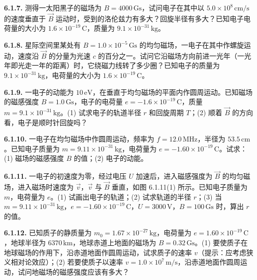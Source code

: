 \vfill
\newpage

\textbf{6.1.7.} 测得一太阳黑子的磁场为 $B = 4000\,\mathrm{Gs}$，试问电子在其中以 $5.0 \times 10^{8}\,\mathrm{cm/s}$ 的速度垂直于 $\vec{B}$ 运动时，受到的洛伦兹力有多大？回旋半径有多大？已知电子电荷量的大小为 $1.6 \times 10^{-19}\,\mathrm{C}$，质量为 $9.1 \times 10^{-31}\,\mathrm{kg}$。

\vfill
\newpage

\textbf{6.1.8.} 星际空间里某处有 $B = 1.0 \times 10^{-5}\,\mathrm{Gs}$ 的均匀磁场，一电子在其中作螺旋运动，速度沿 $\vec{B}$ 的分量为光速 $c$ 的百分之一。试问它沿磁场方向前进一光年（一光年即光走一年的距离）时，它绕磁力线转了多少圈？已知电子的质量为 $9.1 \times 10^{-31}\,\mathrm{kg}$，电荷量的大小为 $1.6 \times 10^{-19}\,\mathrm{C}$。

\vfill
\newpage

\textbf{6.1.9.} 一电子的动能为 $10\,\mathrm{eV}$，在垂直于均匀磁场的平面内作圆周运动。已知磁场的磁感强度 $B = 1.0\,\mathrm{Gs}$，电子的电荷量 $e = -1.6 \times 10^{-19}\,\mathrm{C}$，质量 $m = 9.1 \times 10^{-31}\,\mathrm{kg}$。(1) 试求电子的轨道半径 $r$ 和回旋周期 $T$；(2) 顺着 $\vec{B}$ 的方向看，电子是顺时针回旋吗？

\vfill
\newpage

\textbf{6.1.10.} 一电子在均匀磁场中作圆周运动，频率为 $f = 12.0\,\mathrm{MHz}$，半径为 $53.5\,\mathrm{cm}$。已知电子质量为 $m = 9.11 \times 10^{-31}\,\mathrm{kg}$，电荷量为 $e = -1.60 \times 10^{-19}\,\mathrm{C}$。试求：(1) 磁场的磁感强度 $B$ 的值；(2) 电子的动能。

\vfill
\newpage

\textbf{6.1.11.} 一电子的初速度为零，经过电压 $U$ 加速后，进入磁感强度为 $\vec{B}$ 的均匀磁场，进入磁场时速度为 $\vec{v}$，$\vec{v}$ 与 $\vec{B}$ 垂直，如图 6.1.11(1) 所示。已知电子质量为 $m$，电荷量为 $e$。(1) 试画出电子的轨道；(2) 试求轨道的半径 $r$；(3) 当 $m = 9.11 \times 10^{-31}\,\mathrm{kg}$，$e = -1.60 \times 10^{-19}\,\mathrm{C}$，$U = 3000\,\mathrm{V}$，$B = 100\,\mathrm{Gs}$ 时，算出 $r$ 的值。

\begin{center}
\end{center}

\vfill
\newpage

\textbf{6.1.12.} 已知质子的静质量为 $m_{0} = 1.67 \times 10^{-27}\,\mathrm{kg}$，电荷量为 $e = 1.60 \times 10^{-19}\,\mathrm{C}$，地球半径为 $6370\,\mathrm{km}$，地球赤道上地面的磁场为 $B = 0.32\,\mathrm{Gs}$。(1) 要使质子在地球磁场的作用下，沿赤道地面作圆周运动，试求质子的速率 $v$（提示：应考虑狭义相对论效应）；(2) 若要使质子以速率 $v = 1.0 \times 10^{7}\,\mathrm{m/s}$，沿赤道地面作圆周运动，试问地磁场的磁感强度应该有多大？

